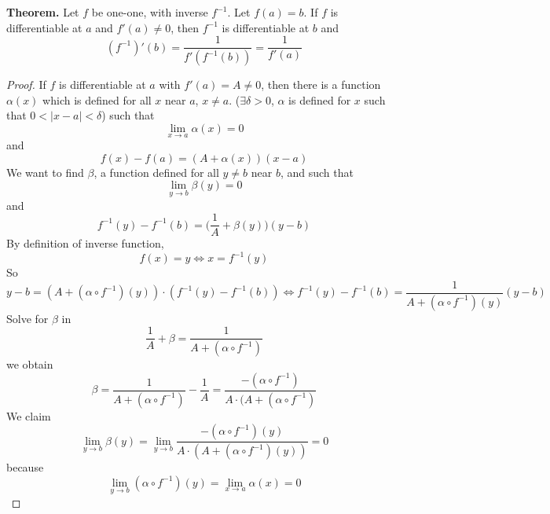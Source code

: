 \documentclass[10pt,letterpaper]{article}
\begin{document}
\begin{enumerate}[(1)]
	\textbf{Theorem. } Let $f$ be one-one, with inverse $f^{-1}$. Let $f(a) = b$. If 
	$f$ is differentiable at $a$ and $f'(a) \neq 0$, then $f^{-1}$ is differentiable at $b$ and 
	$$(f^{-1})'(b) = \dfrac{1}{f'(f^{-1}(b))} = \dfrac{1}{f'(a)}$$
\begin{proof}
	If $f$ is differentiable at $a$ with $f'(a) = A \neq 0$, then there is a function $\alpha(x)$
	which is defined for all $x$ near $a$, $x \neq a$. ($\exists \delta > 0$, $\alpha$ is defined for $x$ 
	such that $0 < |x - a| < \delta$) such that
	$$\displaystyle\lim_{x\to a}\alpha(x) = 0$$
	and
	$$f(x) - f(a) = (A + \alpha(x))(x - a)$$
	We want to find $\beta$, a function defined for all $y \neq b$ near $b$, and such that
	$$\displaystyle\lim_{y\to b}\beta(y) = 0$$
	and
	$$f^{-1}(y) - f^{-1}(b) = \bigg( \dfrac{1}{A} + \beta(y) \bigg)( y - b)$$
	By definition of inverse function,
	$$f(x) = y \Leftrightarrow x = f^{-1}(y)$$
	So
	$$y - b = (A + (\alpha \circ f^{-1})(y)) \cdot (f^{-1}(y) - f^{-1}(b)) \Leftrightarrow
	f^{-1}(y) - f^{-1}(b) = \dfrac{1}{A + (\alpha \circ f^{-1})(y)}(y - b)$$	
	Solve for $\beta$ in
	$$\dfrac{1}{A} + \beta = \dfrac{1}{A + (\alpha \circ f^{-1})}$$
	we obtain
	$$\beta = \dfrac{1}{A + (\alpha \circ f^{-1})} - \dfrac{1}{A} 
	= \dfrac{ -(\alpha \circ f^{-1})}{A \cdot (A + (\alpha \circ f^{-1})}$$
	We claim
$$\displaystyle\lim_{y\to b}\beta(y) = \displaystyle\lim_{y\to b}
\dfrac{-(\alpha \circ f^{-1})(y)}{A \cdot (A + (\alpha \circ f^{-1})(y))} = 0$$
because
$$\displaystyle\lim_{y\to b}(\alpha \circ f^{-1})(y) = 
\displaystyle\lim_{x\to a}\alpha(x) = 0$$

	
\end{proof}
	
	
\end{enumerate}
\end{document}
